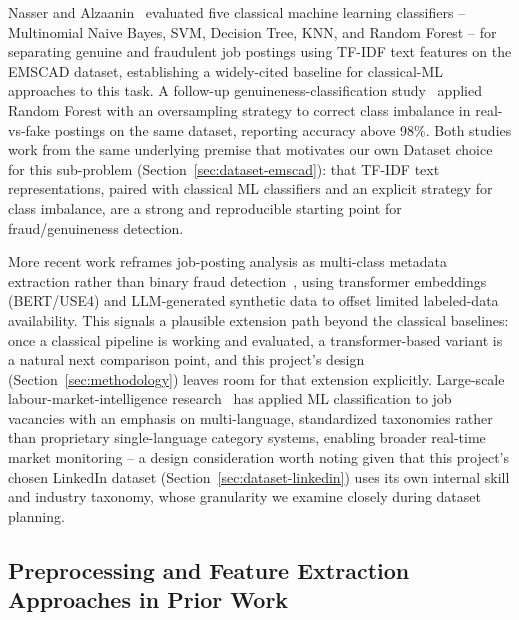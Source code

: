 \documentclass[11pt,a4paper]{article}
\begin{document}
Nasser and Alzaanin~\cite{nasser2020} evaluated five classical machine learning
classifiers -- Multinomial Naive Bayes, SVM, Decision Tree, KNN, and Random Forest -- for
separating genuine and fraudulent job postings using TF-IDF text features on the EMSCAD
dataset, establishing a widely-cited baseline for classical-ML approaches to this task.
A follow-up genuineness-classification study~\cite{ijraset2021} applied Random Forest
with an oversampling strategy to correct class imbalance in real-vs-fake postings on the
same dataset, reporting accuracy above 98\%. Both studies work from the same underlying
premise that motivates our own Dataset choice for this sub-problem (Section~\ref{sec:dataset-emscad}):
that TF-IDF text representations, paired with classical ML classifiers and an explicit
strategy for class imbalance, are a strong and reproducible starting point for
fraud/genuineness detection.

More recent work reframes job-posting analysis as multi-class metadata extraction rather
than binary fraud detection~\cite{metadata2023}, using transformer embeddings (BERT/USE4)
and LLM-generated synthetic data to offset limited labeled-data availability. This
signals a plausible extension path beyond the classical baselines: once a classical
pipeline is working and evaluated, a transformer-based variant is a natural next
comparison point, and this project's design (Section~\ref{sec:methodology}) leaves room
for that extension explicitly. Large-scale labour-market-intelligence research~\cite{boselli}
has applied ML classification to job vacancies with an emphasis on multi-language,
standardized taxonomies rather than proprietary single-language category systems,
enabling broader real-time market monitoring -- a design consideration worth noting
given that this project's chosen LinkedIn dataset (Section~\ref{sec:dataset-linkedin})
uses its own internal skill and industry taxonomy, whose granularity we examine closely
during dataset planning.

\subsection{Preprocessing and Feature Extraction Approaches in Prior Work}
\label{sec:lit-preprocessing}
\end{document}
